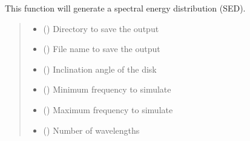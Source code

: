 \documentclass[a4paper,11pt,english]{sphinxmanual}
\begin{document}
\begin{fulllineitems}
\begin{fulllineitems}
\label{\detokenize{radmc3d:simulate.generate_simulation.generate_sed}}
\pysigstartsignatures
\pysiglinewithargsret
{}
{\sphinxparamcomma {}\sphinxparamcomma {}\sphinxparamcomma {}\sphinxparamcomma {}\sphinxparamcomma {}\sphinxparamcomma {}\sphinxparamcomma {}}
{}
\pysigstopsignatures
\sphinxAtStartPar
This function will generate a spectral energy distribution (SED).
\begin{quote}\begin{description}
\begin{itemize}
\item {} 
\sphinxAtStartPar
{} () \textendash{} Directory to save the output

\item {} 
\sphinxAtStartPar
{} () \textendash{} File name to save the output

\item {} 
\sphinxAtStartPar
{} () \textendash{} Inclination angle of the disk

\item {} 
\sphinxAtStartPar
{} () \textendash{} Minimum frequency to simulate

\item {} 
\sphinxAtStartPar
{} () \textendash{} Maximum frequency to simulate

\item {} 
\sphinxAtStartPar
{} () \textendash{} Number of wavelengths


\end{itemize}
\end{description}
\end{quote}
\end{fulllineitems}
\end{fulllineitems}
\end{document}
